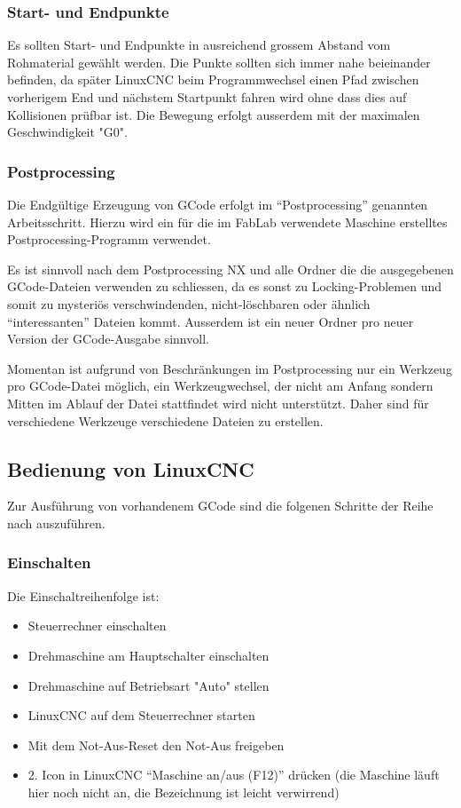 \documentclass{\basedir/fablab-document}
\begin{document}
\subsubsection{Start- und Endpunkte}

Es sollten Start- und Endpunkte in ausreichend grossem Abstand vom Rohmaterial gewählt werden. Die Punkte sollten sich immer nahe beieinander befinden, da später LinuxCNC beim Programmwechsel einen Pfad zwischen vorherigem End und nächstem Startpunkt fahren wird ohne dass dies auf Kollisionen prüfbar ist.
Die Bewegung erfolgt ausserdem mit der maximalen Geschwindigkeit "G0".

\subsubsection{Postprocessing}

Die Endgültige Erzeugung von GCode erfolgt im "`Postprocessing"' genannten Arbeitsschritt. Hierzu wird ein für die im FabLab verwendete Maschine erstelltes Postprocessing-Programm verwendet. 

Es ist sinnvoll nach dem Postprocessing NX und alle Ordner die die ausgegebenen
GCode-Dateien verwenden zu schliessen, da es sonst zu Locking-Problemen und
somit zu mysteriös verschwindenden, nicht-löschbaren oder ähnlich
"`interessanten"' Dateien kommt. Ausserdem ist ein neuer Ordner pro neuer
Version der GCode-Ausgabe sinnvoll.

Momentan ist aufgrund von Beschränkungen im Postprocessing nur ein Werkzeug pro GCode-Datei möglich, ein Werkzeugwechsel, der nicht am Anfang sondern Mitten im Ablauf der Datei stattfindet wird nicht unterstützt. Daher sind für verschiedene Werkzeuge verschiedene Dateien zu erstellen.

\subsection{Bedienung von LinuxCNC}

Zur Ausführung von vorhandenem GCode sind die folgenen Schritte der Reihe nach auszuführen.

\subsubsection{Einschalten}
Die Einschaltreihenfolge ist:
\begin{itemize}
	\item Steuerrechner einschalten
	\item Drehmaschine am Hauptschalter einschalten
	\item Drehmaschine auf Betriebsart "Auto" stellen
	\item LinuxCNC auf dem Steuerrechner starten
	\item Mit dem Not-Aus-Reset den Not-Aus freigeben
	\item 2. Icon in LinuxCNC "`Maschine an/aus (F12)"' drücken (die Maschine läuft hier noch nicht an, die Bezeichnung ist leicht verwirrend)
\end{itemize}
\end{document}

